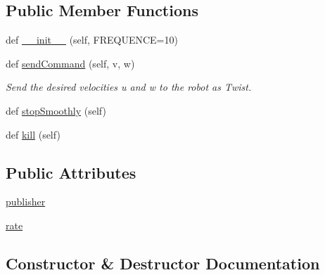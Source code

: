 \subsection*{Public Member Functions}
\begin{DoxyCompactItemize}
\item 
def \hyperlink{classcmd__TTB_1_1rosCom_1_1TurtlebotPublisher_a42833ada210e246fab7386110a43a934}{\+\_\+\+\_\+init\+\_\+\+\_\+} (self, F\+R\+E\+Q\+U\+E\+N\+CE=10)
\item 
def \hyperlink{classcmd__TTB_1_1rosCom_1_1TurtlebotPublisher_a157683d1e9db137dc27823546d901246}{send\+Command} (self, v, w)
\begin{DoxyCompactList}\small\item\em Send the desired velocities u and w to the robot as Twist. \end{DoxyCompactList}\item 
def \hyperlink{classcmd__TTB_1_1rosCom_1_1TurtlebotPublisher_aaabea5c15e3daa024cce879db332d0b1}{stop\+Smoothly} (self)
\item 
def \hyperlink{classcmd__TTB_1_1rosCom_1_1TurtlebotPublisher_a25af8f04357707576fa57d524860535b}{kill} (self)
\end{DoxyCompactItemize}
\subsection*{Public Attributes}
\begin{DoxyCompactItemize}
\item 
\hyperlink{classcmd__TTB_1_1rosCom_1_1TurtlebotPublisher_a14ff1a896341077ba1a89e7411078e0f}{publisher}
\item 
\hyperlink{classcmd__TTB_1_1rosCom_1_1TurtlebotPublisher_a98cdf1c16a60872288eb9acc94be2873}{rate}
\end{DoxyCompactItemize}


\subsection{Constructor \& Destructor Documentation}
